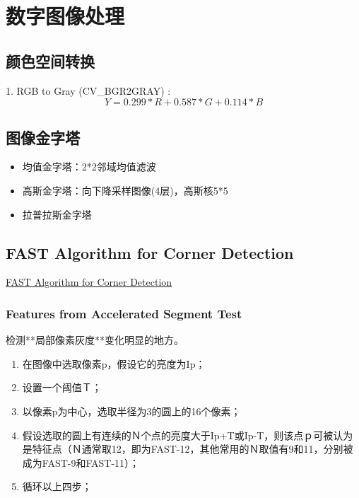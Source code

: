 \chapter{数字图像处理}

\section{颜色空间转换}
1. RGB to Gray (CV\_BGR2GRAY) :
\begin{equation} Y = 0.299*R + 0.587*G + 0.114*B \end{equation}

\section{图像金字塔}
\begin{itemize}
\item 均值金字塔：2*2邻域均值滤波
\item 高斯金字塔：向下降采样图像(4层)，高斯核5*5
\item 拉普拉斯金字塔
\end{itemize}

\section{FAST Algorithm for Corner Detection}

\href{https://docs.opencv.org/3.0-beta/doc/py_tutorials/py_feature2d/py_fast/py_fast.html}{FAST Algorithm for Corner Detection}

\subsection{Features from Accelerated Segment Test}
检测**局部像素灰度**变化明显的地方。
\begin{enumerate}   
\item 在图像中选取像素p，假设它的亮度为Ip；
\item 设置一个阈值Ｔ；
\item 以像素p为中心，选取半径为3的圆上的16个像素；
\item 假设选取的圆上有连续的Ｎ个点的亮度大于Ip+T或Ip-T，则该点ｐ可被认为是特征点（Ｎ通常取12，即为FAST-12，其他常用的Ｎ取值有9和11，分别被成为FAST-9和FAST-11）；
\item 循环以上四步；
\end{enumerate}


